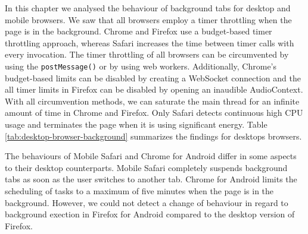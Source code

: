 \documentclass[
	ruledheaders=section,%
	class=report,%
	thesis={type=bachelor},%
	accentcolor=9c,%
	custommargins=true,%
	marginpar=false,%
	parskip=half-,%
	fontsize=11pt,%
]{tudapub}
\begin{document}
  In this chapter we analysed the behaviour of background tabs for desktop and mobile browsers. We saw that all browsers employ a timer throttling when the page is in the background. Chrome and Firefox use a budget-based timer throttling approach, whereas Safari increases the time between timer calls with every invocation. The timer throttling of all browsers can be circumvented by using the \texttt{postMessage()} or by using web workers. Additionally, Chrome's budget-based limits can be disabled by creating a WebSocket connection and the all timer limits in Firefox can be disabled by opening an inaudible AudioContext. With all circumvention methods, we can saturate the main thread for an infinite amount of time in Chrome and Firefox. Only Safari detects continuous high CPU usage and terminates the page when it is using significant energy. Table \ref{tab:desktop-browser-background} summarizes the findings for desktops browsers.

    The behaviours of Mobile Safari and Chrome for Android differ in some aspects to their desktop counterparts. Mobile Safari completely suspends background tabs as soon as the user switches to another tab. Chrome for Android limits the scheduling of tasks to a maximum of five minutes when the page is in the background. However, we could not detect a change of behaviour in regard to background exection in Firefox for Android compared to the desktop version of Firefox.
\end{document}
